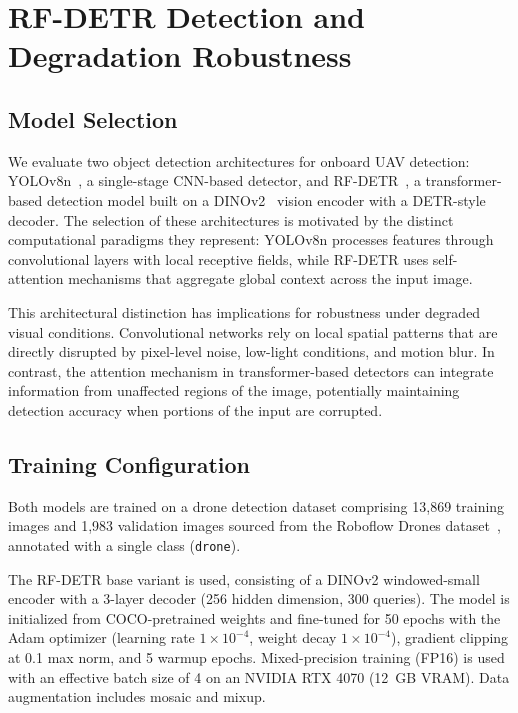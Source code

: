 \documentclass[11pt,letterpaper]{article}
\begin{document}
\section{RF-DETR Detection and Degradation Robustness}
\label{sec:rfdetr}


\subsection{Model Selection}
\label{sec:model_selection}

We evaluate two object detection architectures for onboard UAV detection: YOLOv8n~\cite{ultralytics2023}, a single-stage CNN-based detector, and RF-DETR~\cite{rfdetr2025}, a transformer-based detection model built on a DINOv2~\cite{oquab2024dinov2} vision encoder with a DETR-style~\cite{carion2020detr} decoder. The selection of these architectures is motivated by the distinct computational paradigms they represent: YOLOv8n processes features through convolutional layers with local receptive fields, while RF-DETR uses self-attention mechanisms that aggregate global context across the input image.

This architectural distinction has implications for robustness under degraded visual conditions. Convolutional networks rely on local spatial patterns that are directly disrupted by pixel-level noise, low-light conditions, and motion blur. In contrast, the attention mechanism in transformer-based detectors can integrate information from unaffected regions of the image, potentially maintaining detection accuracy when portions of the input are corrupted.

\subsection{Training Configuration}
\label{sec:training}

Both models are trained on a drone detection dataset comprising 13{,}869 training images and 1{,}983 validation images sourced from the Roboflow Drones dataset~\cite{roboflowdrones}, annotated with a single class (\texttt{drone}).

The RF-DETR base variant is used, consisting of a DINOv2 windowed-small encoder with a 3-layer decoder (256 hidden dimension, 300 queries). The model is initialized from COCO-pretrained weights and fine-tuned for 50 epochs with the Adam optimizer (learning rate $1 \times 10^{-4}$, weight decay $1 \times 10^{-4}$), gradient clipping at 0.1 max norm, and 5 warmup epochs. Mixed-precision training (FP16) is used with an effective batch size of 4 on an NVIDIA RTX 4070 (12~GB VRAM). Data augmentation includes mosaic and mixup.
\end{document}
